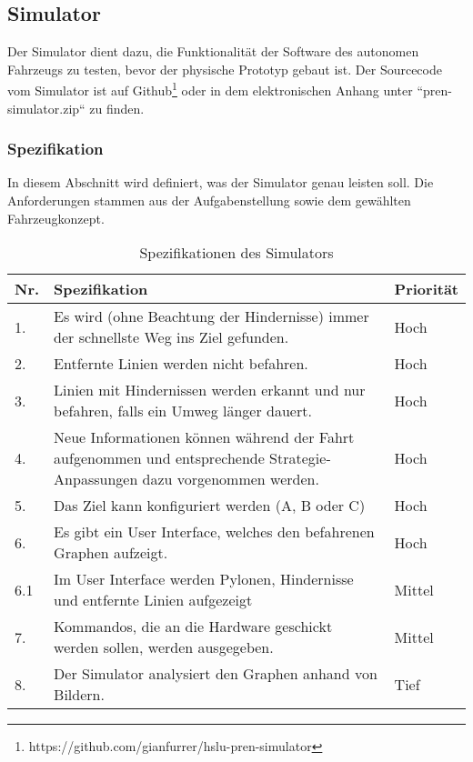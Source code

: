 \documentclass[../main.tex]{subfiles}
\begin{document}
\newpage
\subsection{Simulator}\label{simulator}

Der Simulator dient dazu, die Funktionalität der Software des autonomen Fahrzeugs zu testen, bevor der physische Prototyp gebaut ist.
Der Sourcecode vom Simulator ist auf Github\footnote{https://github.com/gianfurrer/hslu-pren-simulator} oder in dem elektronischen Anhang unter ``pren-simulator.zip`` zu finden.

\subsubsection{Spezifikation}

In diesem Abschnitt wird definiert, was der Simulator genau leisten soll. Die Anforderungen stammen aus der Aufgabenstellung sowie dem gewählten Fahrzeugkonzept.

\begin{table}[htbp!]
    \centering
    \begin{tabularx}{\textwidth}{| l | X | l |}
        \hline
        \textbf{Nr.} & \textbf{Spezifikation} & \textbf{Priorität} \\ \hline
        1. & Es wird (ohne Beachtung der Hindernisse) immer der schnellste Weg ins Ziel gefunden. & Hoch \\ \hline
        2. & Entfernte Linien werden nicht befahren. & Hoch \\ \hline
        3. & Linien mit Hindernissen werden erkannt und nur befahren, falls ein Umweg länger dauert. & Hoch \\ \hline
        4. & Neue Informationen können während der Fahrt aufgenommen und entsprechende Strategie-Anpassungen dazu vorgenommen werden. & Hoch \\ \hline
        5. & Das Ziel kann konfiguriert werden (A, B oder C) & Hoch \\ \hline
        6. & Es gibt ein User Interface, welches den befahrenen Graphen aufzeigt. & Hoch \\ \hline
        6.1 & Im User Interface werden Pylonen, Hindernisse und entfernte Linien aufgezeigt & Mittel \\ \hline
        7. & Kommandos, die an die Hardware geschickt werden sollen, werden ausgegeben. & Mittel \\ \hline
        8. & Der Simulator analysiert den Graphen anhand von Bildern. & Tief \\ \hline
    \end{tabularx}
    \caption{Spezifikationen des Simulators}
\end{table}
\end{document}
